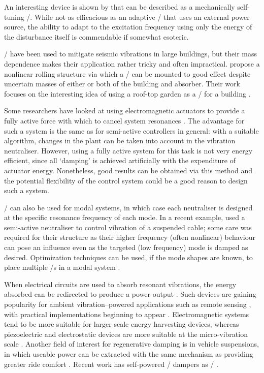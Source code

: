 An interesting device is shown by \cite{ivers2008} that can be described as a mechanically self-tuning \vibneut/.
While not as efficacious as an adaptive \vibneut/ that uses an external power source, the ability to adapt to the excitation frequency using only the energy of the disturbance itself is commendable if somewhat esoteric.

\Vibneut/ have been used to mitigate seismic vibrations in large buildings, but their mass dependence makes their application rather tricky and often impractical. 
\textcite{matta2008} propose a nonlinear rolling structure via which a \vibneut/ can be mounted to good effect despite uncertain masses of either or both of the building and absorber.
Their work focuses on the interesting idea of using a roof-top garden as a \vibneut/ for a building \cite{matta2008a}.

Some researchers have looked at using electromagnetic actuators to provide a fully active force with which to cancel system resonances \cite{chen2005a,wu2007,kim2008-iecst}.
The advantage for such a system is the same as for semi-active controllers in general: with a suitable algorithm, changes in the plant can be taken into account in the vibration neutraliser.
However, using a fully active system for this task is not very energy efficient, since all `damping' is achieved artificially with the expenditure of actuator energy.
Nonetheless, good results can be obtained via this method and the potential flexibility of the control system could be a good reason to design such a system.

\Vibneut/ can also be used for modal systems, in which case each neutraliser is designed at the specific resonance frequency of each mode.
In a recent example, \textcite{casciati2007} used a semi-active neutraliser to control vibration of a suspended cable; some care was required for their structure as their higher frequency (often nonlinear) behaviour can pose an influence even as the targeted (low frequency) mode is damped as desired.
Optimization techniques can be used, if the mode shapes are known, to place multiple \vibneut/s in a modal system \cite{petit2009-jva}.

When electrical circuits are used to absorb resonant vibrations, the energy absorbed can be redirected to produce a power output \cite{stephen2006}.
Such devices are gaining popularity for ambient vibration--powered applications such as remote sensing \cite{arnold2007}, with practical implementations beginning to appear \cite{ferrari2009-sms}.
Electromagnetic systems tend to be more suitable for larger scale energy harvesting devices, whereas piezoelectric and electrostatic devices are more suitable at the micro-vibration scale \cite{beeby2009}.
Another field of interest for regenerative damping is in vehicle suspensions, in which useable power can be extracted with the same mechanism as providing greater ride comfort \cite{graves2000thesis}.
Recent work has self-powered \magnetorh/ dampers as \vibneut/ \cite{choi2009-jva}.

